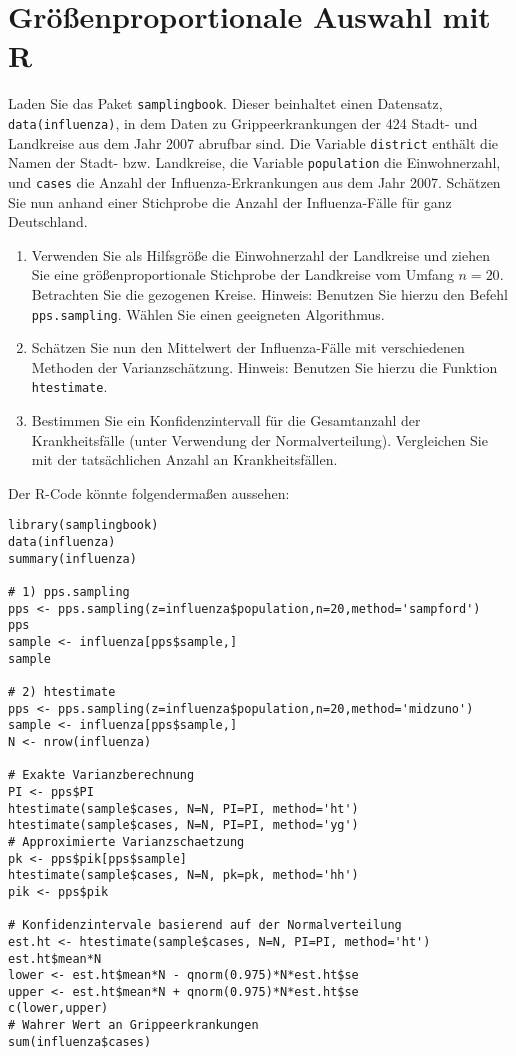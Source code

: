 \documentclass{article}
\begin{document}
\section{Größenproportionale Auswahl mit R}
Laden Sie das Paket \texttt{samplingbook}. Dieser beinhaltet einen Datensatz, \texttt{data(influenza)}, in dem Daten zu Grippeerkrankungen der 424 Stadt- und Landkreise aus dem Jahr 2007 abrufbar sind. Die Variable \texttt{district} enthält die Namen der Stadt- bzw. Landkreise, die Variable \texttt{population} die Einwohnerzahl, und \texttt{cases} die Anzahl der Influenza-Erkrankungen aus dem Jahr 2007. Schätzen Sie nun anhand einer Stichprobe die Anzahl der Influenza-Fälle für ganz Deutschland.
\begin{enumerate}
	\item Verwenden Sie als Hilfsgröße die Einwohnerzahl der Landkreise und ziehen Sie eine größenproportionale Stichprobe der Landkreise vom Umfang $n=20$. Betrachten Sie die gezogenen Kreise. 
	Hinweis: Benutzen Sie hierzu den Befehl \texttt{pps.sampling}. Wählen Sie einen geeigneten Algorithmus.
	\item Schätzen Sie nun den Mittelwert der Influenza-Fälle mit verschiedenen Methoden der Varianzschätzung. Hinweis: Benutzen Sie hierzu die Funktion \texttt{htestimate}.
	\item Bestimmen Sie ein Konfidenzintervall für die Gesamtanzahl der Krankheitsfälle (unter Verwendung der Normalverteilung). Vergleichen Sie mit der tatsächlichen Anzahl an Krankheitsfällen.
\end{enumerate}
\begin{solution}
Der R-Code könnte folgendermaßen aussehen:
\begin{lstlisting}
library(samplingbook)
data(influenza)
summary(influenza)

# 1) pps.sampling
pps <- pps.sampling(z=influenza$population,n=20,method='sampford')
pps
sample <- influenza[pps$sample,]
sample

# 2) htestimate
pps <- pps.sampling(z=influenza$population,n=20,method='midzuno')
sample <- influenza[pps$sample,]
N <- nrow(influenza)

# Exakte Varianzberechnung
PI <- pps$PI
htestimate(sample$cases, N=N, PI=PI, method='ht')
htestimate(sample$cases, N=N, PI=PI, method='yg')
# Approximierte Varianzschaetzung
pk <- pps$pik[pps$sample]
htestimate(sample$cases, N=N, pk=pk, method='hh')
pik <- pps$pik

# Konfidenzintervale basierend auf der Normalverteilung
est.ht <- htestimate(sample$cases, N=N, PI=PI, method='ht')
est.ht$mean*N  
lower <- est.ht$mean*N - qnorm(0.975)*N*est.ht$se
upper <- est.ht$mean*N + qnorm(0.975)*N*est.ht$se
c(lower,upper) 
# Wahrer Wert an Grippeerkrankungen
sum(influenza$cases)
\end{lstlisting}

\end{solution}
\end{document}
